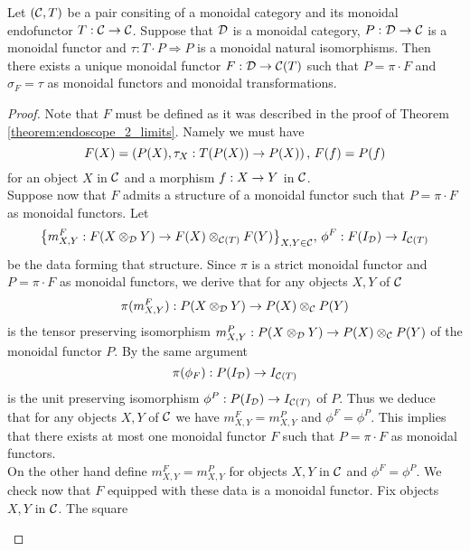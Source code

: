 \begin{theorem}\label{theorem:endoscope_monoidal_2_limit}
Let $({\mathcal C},T)$ be a pair consiting of a monoidal category and its monoidal endofunctor $T:{\mathcal C}\rightarrow {\mathcal C}$. Suppose that ${\mathcal D}$ is a monoidal category, $P:{\mathcal D}\rightarrow {\mathcal C}$ is a monoidal functor and $\tau:T\cdot P \Rightarrow P$ is a monoidal natural isomorphisms. Then there exists a unique monoidal functor $F:{\mathcal D}\rightarrow {\mathcal C}(T)$ such that $P = \pi\cdot F$ and $\sigma_F = \tau$ as monoidal functors and monoidal transformations.
\end{theorem}
\begin{proof}
Note that $F$ must be defined as it was described in the proof of Theorem \ref{theorem:endoscope_2_limits}. Namely we must have
$$F(X) = \left(P(X),\tau_X:T(P(X))\rightarrow P(X)\right),\,F(f) = P(f)$$
for an object $X$ in ${\mathcal C}$ and a morphism $f:X\rightarrow Y$ in ${\mathcal C}$.\\
Suppose now that $F$ admits a structure of a monoidal functor such that $P = \pi\cdot F$ as monoidal functors. Let
$$\big\{m^F_{X,Y}:F(X\otimes_{{\mathcal D}}Y)\rightarrow F(X)\otimes_{{\mathcal C}(T)}F(Y)\big\}_{X,Y\in {\mathcal C}},\,\phi^F:F(I_{{\mathcal D}})\rightarrow I_{{\mathcal C}(T)}$$
be the data forming that structure. Since $\pi$ is a strict monoidal functor and $P = \pi\cdot F$ as monoidal functors, we derive that for any objects $X,Y$ of ${\mathcal C}$
$$\pi(m^F_{X,Y}):P(X\otimes_{{\mathcal D}}Y) \rightarrow P(X)\otimes_{{\mathcal C}}P(Y)$$
is the tensor preserving isomorphism $m^{P}_{X,Y}:P(X\otimes_{{\mathcal D}}Y) \rightarrow P(X)\otimes_{{\mathcal C}}P(Y)$ of the monoidal functor $P$. By the same argument
$$\pi(\phi_F):P(I_{{\mathcal D}})\rightarrow I_{{\mathcal C}(T)}$$
is the unit preserving isomorphism $\phi^{P}:P(I_{{\mathcal D}})\rightarrow I_{{\mathcal C}(T)}$ of $P$. Thus we deduce that for any objects $X,Y$ of ${\mathcal C}$ we have $m^F_{X,Y} = m^{P}_{X,Y}$ and $\phi^F = \phi^{P}$. This implies that there exists at most one monoidal functor $F$ such that $P = \pi\cdot F$ as monoidal functors.\\
On the other hand define $m^F_{X,Y} = m^{P}_{X,Y}$ for objects $X,Y$ in ${\mathcal C}$ and $\phi^F = \phi^{P}$. We check now that $F$ equipped with these data is a monoidal functor. Fix objects $X,Y$ in ${\mathcal C}$. The square
\begin{center}
\end{center}
\end{proof}
